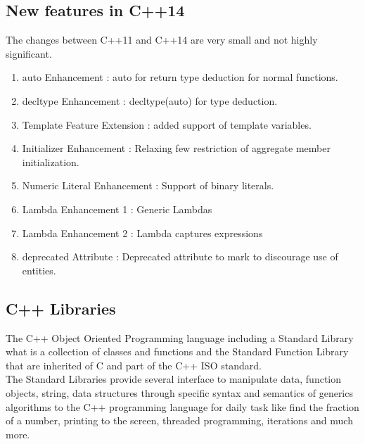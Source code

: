 \documentclass[12pt]{article}
\begin{document}
\subsection{New features in C++14}
{\setlength{\parindent}{0cm}
The changes between C++11 and C++14 are very small and not highly significant.\\
\begin{enumerate}
\item auto Enhancement : auto for return type deduction for normal functions. 
\item decltype Enhancement : decltype(auto) for type deduction.
\item Template Feature Extension : added support of template variables.
\item Initializer Enhancement : Relaxing few restriction of aggregate member initialization.
\item Numeric Literal Enhancement : Support of binary literals.
\item Lambda Enhancement 1 : Generic Lambdas
\item Lambda Enhancement 2 : Lambda captures expressions
\item deprecated Attribute : Deprecated attribute to mark to discourage use of entities.\cite{Sahoo}
\end{enumerate}


\subsection{C++ Libraries}
The C++ Object Oriented Programming language including a Standard Library what is a collection of classes and functions and the Standard Function Library that are inherited of C and part of the C++ ISO standard.\cite{Tutorialspointlibraries}\\

The Standard Libraries provide several interface to manipulate data, function objects, string, data structures through specific syntax and semantics of generics algorithms to the C++ programming language for daily task like find the fraction of a number, printing to the screen, threaded programming, iterations and much more.\\ \cite{Tutorialspoint}

}
\end{document}
